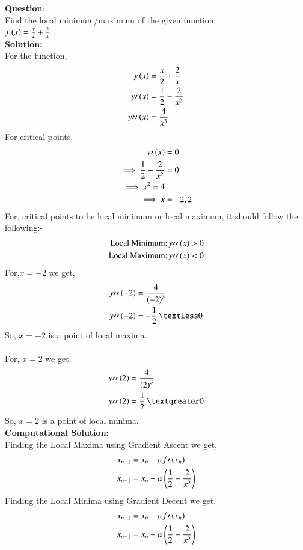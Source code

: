\documentclass[journal]{IEEEtran}
\begin{document}
\textbf{Question}:\\
Find the local minimum/maximum of the given function:\\
$f\left(x\right) = \frac{x}{2} + \frac{2}{x}$
\\
\textbf{Solution: }\\
For the function,
\begin{align}
y\left(x\right) &= \frac{x}{2} + \frac{2}{x} \\
    y\prime\left(x\right) &= \frac{1}{2}-\frac{2}{x^{2}}\\
    y\prime\prime\left(x\right) &= \frac{4}{x^{3}}
\end{align}
For critical points,
\begin{align}
    y\prime\left(x\right) &= 0\\
    \implies   \frac{1}{2}-\frac{2}{x^{2}} &=0\\
    \implies    x^{2}=4 \\
    \implies    x &= -2,2
\end{align}
For, critical points to be local minimum or local maximum, it should follow the following:-
\begin{align}
    \text{Local Minimum:}\, y\prime\prime\left(x\right)&\textgreater 0\\
    \text{Local Maximum:}\, y\prime\prime\left(x\right) &\textless 0
\end{align}
For,$x=-2$ we get,
\begin{align}
    y\prime\prime\brak{-2} &= \frac{4}{\brak{-2}^{3}}\\
    y\prime\prime\brak{-2} &= -\frac{1}{2}\,\textless0
\end{align}
So, $x=-2$ is a point of local maxima.\\ \\
For, $x=2$ we get,
\begin{align}
    y\prime\prime\brak{2} &= \frac{4}{\brak{2}^{3}}\\
    y\prime\prime\brak{2} &= \frac{1}{2}\,\textgreater 0
\end{align}
So, $x=2$ is a point of local minima.\\
\textbf{Computational Solution:}\\
Finding the Local Maxima using Gradient Ascent we get,
\begin{align}
    x_{n+1} &= x_n + \alpha f\prime\left(x_n\right)\\
    x_{n+1} &= x_n + \alpha\left(\frac{1}{2}-\frac{2}{x^{2}} \right)
\end{align}
Finding the Local Minima using Gradient Decent we get,
\begin{align}
    x_{n+1} &= x_n - \alpha f\prime\left(x_n\right)\\
    x_{n+1} &= x_n - \alpha\left(\frac{1}{2}-\frac{2}{x^{2}} \right)
\end{align}
\end{document}
